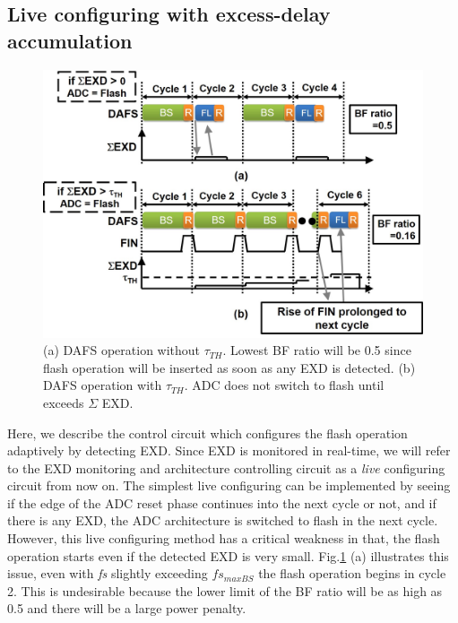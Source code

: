 \subsection{Live configuring with excess-delay accumulation}

\begin{figure}
\centering
  \includegraphics[width=1\textwidth]{figure/chap3/fig11.jpg}
  \caption{(a) DAFS operation without $\tau_{TH}$. Lowest BF ratio will be 0.5 since
flash operation will be inserted as soon as any EXD is detected. (b) DAFS operation with $\tau_{TH}$. ADC does not switch to flash until exceeds $\Sigma$ EXD.}
  \label{fig-3-11}
\end{figure}

Here, we describe the control circuit which configures the flash operation adaptively by detecting EXD. Since EXD is monitored in real-time, we will refer to the EXD monitoring and architecture controlling circuit as a \textit{live} configuring circuit from now on. The simplest live configuring can be implemented by seeing if the edge of the ADC reset phase continues into the next cycle or not, and if there is any EXD, the ADC architecture is switched to flash in the next cycle. However, this live configuring method has a critical weakness in that, the flash operation starts even if the detected EXD is very small. Fig.\ref{fig-3-11} (a) illustrates this issue, even with \textit{fs} slightly exceeding $fs{}_{maxBS}$ the flash operation begins in cycle 2. This is undesirable because the lower limit of the BF ratio will be as high as 0.5 and there will be a large power penalty.

